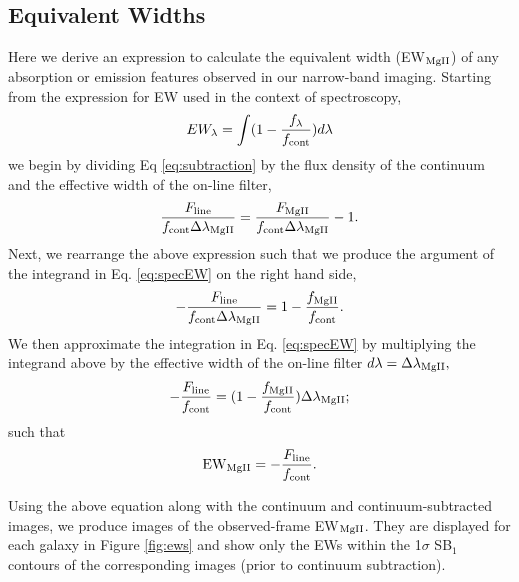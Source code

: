 \documentclass[twocolumn]{aastex62}
\begin{document}
\subsection{Equivalent Widths}\label{subsec.ew}
Here we derive an expression to calculate the equivalent width (EW$_{\rm{MgII}}$) of any absorption or emission features observed in our narrow-band imaging. Starting from the expression for EW used in the context of spectroscopy,
\begin{equation}
EW_{\lambda}=\int (1-\frac{f_{\lambda}}{f_{\rm{cont}}})d\lambda
\label{eq:specEW}
\end{equation}
we begin by dividing Eq \ref{eq:subtraction} by the flux density of the continuum and the effective width of the on-line filter,
\begin{equation}
\frac{F_{\rm{line}}}{f_{\rm{cont}}\Delta \lambda_{\rm{MgII}}}=\frac{F_{\rm{MgII}}}{f_{\rm{cont}}\Delta \lambda_{\rm{MgII}}}- 1.
\end{equation}
Next, we rearrange the above expression such that we produce the argument of the integrand in Eq. \ref{eq:specEW} on the right hand side,
\begin{equation}
-\frac{F_{\rm{line}}}{f_{\rm{cont}}\Delta \lambda_{\rm{MgII}}}=1-\frac{f_{\rm{MgII}}}{f_{\rm{cont}}}.
\end{equation}
We then approximate the integration in Eq. \ref{eq:specEW} by multiplying the integrand above by the effective width of the on-line filter $d\lambda=\Delta \lambda_{\rm{MgII}},$
\begin{equation}
-\frac{F_{\rm{line}}}{f_{\rm{cont}}}=(1-\frac{f_{\rm{MgII}}}{f_{\rm{cont}}})\Delta \lambda_{\rm{MgII}};
\end{equation}
such that
\begin{equation}
{\rm EW}_{\rm{MgII}}=-\frac{F_{\rm{line}}}{f_{\rm{cont}}}.
\end{equation}

Using the above equation along with the continuum and continuum-subtracted images, we produce images of the observed-frame EW$_{\rm{MgII}}$. %
They are displayed for each galaxy in Figure \ref{fig:ews} and show only the EWs within the 1$\sigma$ SB$_1$ contours of the corresponding  images (prior to continuum subtraction). 
\end{document}
